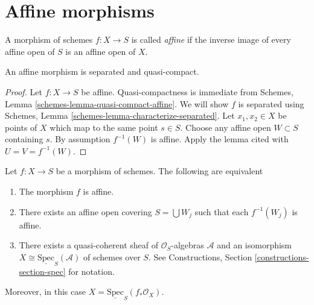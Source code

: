 \section{Affine morphisms}
\label{section-affine}

\begin{definition}
\label{definition-affine}
A morphism of schemes $f : X \to S$ is called {\it affine} if
the inverse image of every affine open of $S$ is an affine
open of $X$.
\end{definition}

\begin{lemma}
\label{lemma-affine-separated}
An affine morphism is separated and quasi-compact.
\end{lemma}

\begin{proof}
Let $f : X \to S$ be affine. Quasi-compactness is immediate from
Schemes, Lemma \ref{schemes-lemma-quasi-compact-affine}.
We will show $f$ is separated using
Schemes, Lemma \ref{schemes-lemma-characterize-separated}. Let
$x_1, x_2 \in X$ be points of $X$ which map to the same point $s \in S$.
Choose any affine open $W \subset S$ containing $s$. By assumption
$f^{-1}(W)$ is affine. Apply the lemma cited with $U = V = f^{-1}(W)$.
\end{proof}

\begin{lemma}
\label{lemma-characterize-affine}
Let $f : X \to S$ be a morphism of schemes.
The following are equivalent
\begin{enumerate}
\item The morphism $f$ is affine.
\item There exists an affine open covering $S = \bigcup W_j$
such that each $f^{-1}(W_j)$ is affine.
\item There exists a quasi-coherent sheaf of $\mathcal{O}_S$-algebras
$\mathcal{A}$ and an isomorphism
$X \cong \underline{\text{Spec}}_S(\mathcal{A})$
of schemes over $S$. See
Constructions, Section \ref{constructions-section-spec} for notation.
\end{enumerate}
Moreover, in this case $X = \underline{\text{Spec}}_S(f_*\mathcal{O}_X)$.
\end{lemma}

